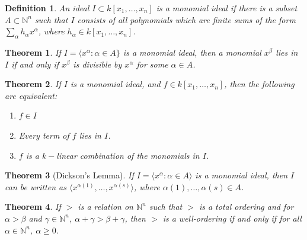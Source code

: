 \documentclass[oneside]{book}
\theoremstyle{mystyle}
\newtheorem{theorem}{Theorem}[section]
\newtheorem{definition}{Definition}[section]
\begin{document}
\begin{definition}
An ideal $I\subset k[x_1,\hdots ,x_n]$ is a monomial ideal if there is a subset $A\subset \mathbb{N}^n$ such that $I$ consists of all polynomials which are finite sums of the form $\sum_{\alpha} h_{\alpha} x^\alpha$, where $h_{\alpha} \in k[x_1,\hdots ,x_n]$. 
\end{definition}
\begin{theorem}
If $I=\langle x^\alpha: \alpha \in A\}$ is a monomial ideal, then a monomial $x^\beta$ lies in $I$ if and only if $x^\beta$ is divisible by $x^\alpha$ for some $\alpha \in A$.
\end{theorem}
\begin{theorem}
If $I$ is a monomial ideal, and $f\in k[x_1,\hdots ,x_n]$, then the following are equivalent:
\begin{enumerate}
        \item $f\in I$
        \item Every term of $f$ lies in $I$.
        \item $f$ is a $k-$linear combination of the monomials in $I$.
\end{enumerate}
\end{theorem}
\begin{theorem}[Dickson's Lemma]
If $I=\langle x^\alpha: \alpha \in A\rangle$ is a monomial ideal, then $I$ can be written as $\langle x^{\alpha(1)}, \hdots, x^{\alpha(s)}\rangle$, where $\alpha(1),\hdots, \alpha(s) \in A$. 
\end{theorem}
\begin{theorem}
If $>$ is a relation on $\mathbb{N}^n$ such that $>$ is a total ordering and for $\alpha>\beta$ and $\gamma\in \mathbb{N}^n$, $\alpha+\gamma>\beta+\gamma$, then $>$ is a well-ordering if and only if for all $\alpha \in \mathbb{N}^n$, $\alpha \geq 0$.
\end{theorem}
\end{document}
